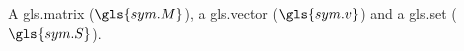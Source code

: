 \documentclass{report}
\begin{document}
A \gls{gls.matrix} ($\gls{sym.M}$), 
a \gls{gls.vector} ($\gls{sym.v}$) 
and a \gls{gls.set} ($\gls{sym.S}$).

\printunsrtglossaries
\end{document}
